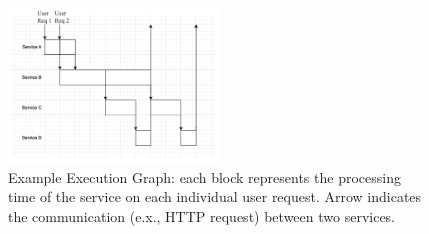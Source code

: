 

\begin{figure}[h]
    \centering
    \includegraphics[width=0.5\textwidth]{img/original}
    \caption{Example Execution Graph: each block represents the processing time of the service on each individual user request. Arrow indicates the communication (e.x., HTTP request) between two services.}
    \label{fig:example}
\end{figure}


